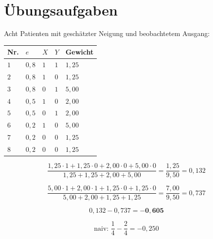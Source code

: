 \section{Übungsaufgaben}

\begin{aufgabe}
Acht Patienten mit geschätzter Neigung und beobachtetem Ausgang:
\begin{center}
{\small
\renewcommand{\arraystretch}{1.44}
\begin{tabular}{@{}P{1.0cm}P{1.4cm}P{1.0cm}P{1.0cm}P{1.8cm}@{}}
\toprule
\textbf{Nr.} & $e$ & $X$ & $Y$ & \textbf{Gewicht}\\
\midrule
$1$ & $0{,}8$ & $1$ & $1$ & $1{,}25$\\
$2$ & $0{,}8$ & $1$ & $0$ & $1{,}25$\\
$3$ & $0{,}8$ & $0$ & $1$ & $5{,}00$\\
$4$ & $0{,}5$ & $1$ & $0$ & $2{,}00$\\
$5$ & $0{,}5$ & $0$ & $1$ & $2{,}00$\\
$6$ & $0{,}2$ & $1$ & $0$ & $5{,}00$\\
$7$ & $0{,}2$ & $0$ & $0$ & $1{,}25$\\
$8$ & $0{,}2$ & $0$ & $0$ & $1{,}25$\\
\bottomrule
\end{tabular}}
\end{center}

\loesung
{}
\[ \frac{1{,}25\cdot1 + 1{,}25\cdot0 + 2{,}00\cdot0 + 5{,}00\cdot0}{1{,}25+1{,}25+2{,}00+5{,}00} = \frac{1{,}25}{9{,}50} = 0{,}132 \]

\[ \frac{5{,}00\cdot1 + 2{,}00\cdot1 + 1{,}25\cdot0 + 1{,}25\cdot0}{5{,}00+2{,}00+1{,}25+1{,}25} = \frac{7{,}00}{9{,}50} = 0{,}737 \]

\[ 0{,}132 - 0{,}737 = \mathbf{-0{,}605} \]

\[ \text{naiv: } \frac{1}{4} - \frac{2}{4} = -0{,}250 \]

\begin{center}
\begin{minipage}{0.88\textwidth}
\end{minipage}
\end{center}
\end{aufgabe}


